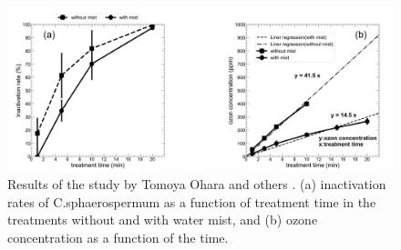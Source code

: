 \begin{figure}
    \centering
    \includegraphics[width=1\textwidth]{images/KIT_work.png}
    \caption[Results of the study by Tomoya Ohara and others]{Results of the study by Tomoya Ohara and others \cite{kit}. (a) inactivation rates of C.sphaerospermum as a function of treatment time in the
    treatments without and with water mist, and (b) ozone concentration as a function of the
    time.}
    \label{fig:kit}
\end{figure}